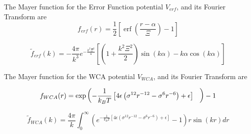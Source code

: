 \documentclass[12pt]{article}
\begin{document}
The Mayer function for the Error Function potential $V_{erf}$, and its Fourier Transform are
\begin{equation}f_{erf}(r)=\frac{1}{2}\left[\operatorname{erf}\left(\frac{r-\alpha}{\Xi}\right)-1\right]\end{equation} 

\begin{equation}\widetilde{f}_{erf}(k)=-\frac{4\pi}{k^3}e^{-\frac{k^2\Xi^2}{4}}\left[\left(1+\frac{k^2\Xi^2}{2}\right)\sin(k\alpha)-k\alpha\cos(k\alpha)\right]\end{equation} 

The Mayer function for the WCA potential $V_{WCA}$, and its Fourier Transform are


\begin{equation}f_{WCA}(r)=\operatorname{exp}\left(-\frac{1}{k_BT}\left[4\epsilon\left(\sigma^{12}r^{-12}-\sigma^{6}r^{-6}\right)+\epsilon\right]\color{white}\frac{1}{1}\color{black}\right)-1\end{equation} 

\begin{equation}\widetilde{f}_{WCA}(k)=\frac{4\pi}{k}\int_0^{\infty}{\left(e^{-\frac{1}{k_BT}\left[4\epsilon\left(\sigma^{12}r^{-12}-\sigma^{6}r^{-6}\right)+\epsilon\right]}-1\right) r\sin(kr)dr}\end{equation} 



\[{}\]
\end{document}
